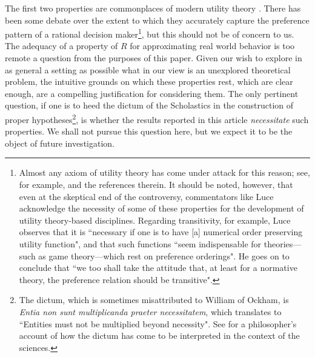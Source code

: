 \documentclass[pdflatex,sn-apa,11pt]{sn-jnl}%
\begin{document}
The first two properties are commonplaces of modern utility theory \citep{white1972uncertain, luce1956semiorders}. There has been some debate over the extent to which they accurately capture the preference pattern of a rational decision maker\footnote{Almost any axiom of utility theory has come under attack for this reason; see, for example, \cite{luce1956semiorders} and the references therein. It should be noted, however, that even at the skeptical end of the controversy, commentators like Luce acknowledge the necessity of some of these properties for the development of utility theory-based disciplines. Regarding transitivity, for example, Luce observes that it is ``necessary if one is to have [a] numerical order preserving utility function", and that such functions ``seem indispensable for theories---such as game theory---which rest on preference orderings". He goes on to conclude that ``we too shall take the attitude that, at least for a normative theory, the preference relation should be transitive".}, but this should not be of concern to us. The adequacy of a property of $R$ for approximating real world behavior is too remote a question from the purposes of this paper. Given our wish to explore in as general a setting as possible what in our view is an unexplored theoretical problem, the intuitive grounds on which these properties rest, which are clear enough, are a compelling justification for considering them. %
The only pertinent question, if one is to heed the dictum of the Scholastics in the construction of proper hypotheses\footnote{The dictum, which is sometimes misattributed to William of Ockham, is \textit{Entia non sunt multiplicanda praeter necessitatem}, which translates to ``Entities must not be multiplied beyond necessity". See \cite{beck1943principle} for a philosopher's account of how the dictum has come to be interpreted in the context of the sciences.}, is whether the results reported in this article \textit{necessitate} such properties. We shall not pursue this question here, but we expect it to be the object of future investigation.

\end{document}
